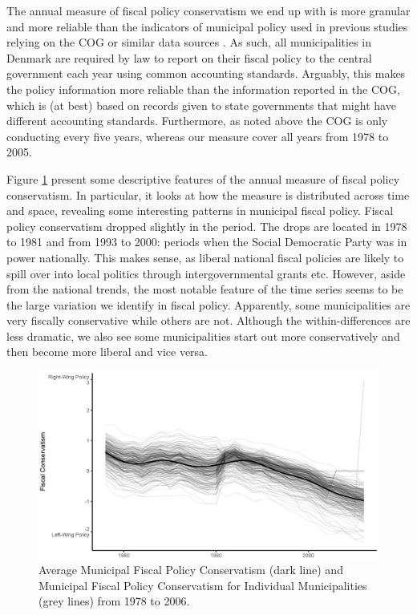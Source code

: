 \documentclass[a4paper,12pt]{article}
\begin{document}
The annual measure of fiscal policy conservatism we end up with is more granular and more reliable than the indicators of municipal policy used in previous studies relying on the COG or similar data sources \citep{tausanovitch2014representation,palus2010responsiveness,sances2017voters,einstein2016pushing,hajnal2010or}. As such, all municipalities in Denmark are required by law to report on their fiscal policy to the central government each year using common accounting standards. Arguably, this makes the policy information more reliable than the information reported in the COG, which is (at best) based on records given to state governments that might have different accounting standards. Furthermore, as noted above the COG is only conducting every five years, whereas our measure cover all years from 1978 to 2005.

Figure \ref{fig:timeline} present some descriptive features of the annual measure of fiscal policy conservatism. In particular, it looks at how the measure is distributed across time and space, revealing some interesting patterns in municipal fiscal policy. Fiscal policy conservatism dropped slightly in the period. The drops are located in 1978 to 1981 and from 1993 to 2000: periods when the Social Democratic Party was in power nationally. This makes sense, as liberal national fiscal policies are likely to spill over into local politics through intergovernmental grants etc.  However, aside from the national trends, the most notable feature of the time series seems to be the large variation we identify in fiscal policy. Apparently, some municipalities are very fiscally conservative while others are not. Although the within-differences are less dramatic, we also see some municipalities start out more conservatively and then become more liberal and vice versa.

\begin{figure}[htbp]
	\centering 
	
	\includegraphics[width=1\textwidth]{fiscal_TimeSeries.eps}
	\caption{Average Municipal Fiscal Policy Conservatism (dark line) and Municipal Fiscal Policy Conservatism for Individual Municipalities (grey lines) from 1978 to 2006.}
	\label{fig:timeline}
	

	
\end{figure}
\end{document}
